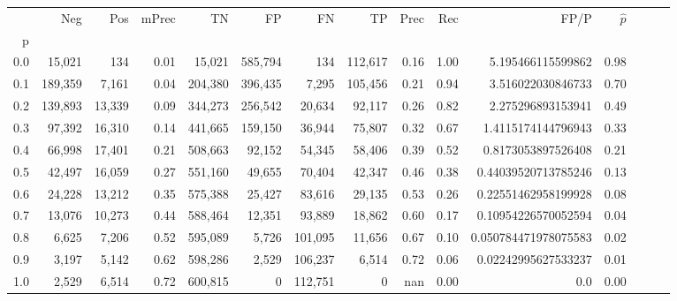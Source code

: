 \begin{tabular}{rrrrrrrrrrrrrrr}
\toprule
{} &      Neg &     Pos & mPrec &       TN &       FP &       FN &       TP &  Prec &   Rec &                  FP/P & $\hat{p}$ \\
p   &          &         &       &          &          &          &          &       &       &                       &           \\
\midrule
0.0 &   15,021 &     134 &  0.01 &   15,021 &  585,794 &      134 &  112,617 &  0.16 &  1.00 &     5.195466115599862 &      0.98 \\
0.1 &  189,359 &   7,161 &  0.04 &  204,380 &  396,435 &    7,295 &  105,456 &  0.21 &  0.94 &     3.516022030846733 &      0.70 \\
0.2 &  139,893 &  13,339 &  0.09 &  344,273 &  256,542 &   20,634 &   92,117 &  0.26 &  0.82 &     2.275296893153941 &      0.49 \\
0.3 &   97,392 &  16,310 &  0.14 &  441,665 &  159,150 &   36,944 &   75,807 &  0.32 &  0.67 &    1.4115174144796943 &      0.33 \\
0.4 &   66,998 &  17,401 &  0.21 &  508,663 &   92,152 &   54,345 &   58,406 &  0.39 &  0.52 &    0.8173053897526408 &      0.21 \\
0.5 &   42,497 &  16,059 &  0.27 &  551,160 &   49,655 &   70,404 &   42,347 &  0.46 &  0.38 &   0.44039520713785246 &      0.13 \\
0.6 &   24,228 &  13,212 &  0.35 &  575,388 &   25,427 &   83,616 &   29,135 &  0.53 &  0.26 &   0.22551462958199928 &      0.08 \\
0.7 &   13,076 &  10,273 &  0.44 &  588,464 &   12,351 &   93,889 &   18,862 &  0.60 &  0.17 &   0.10954226570052594 &      0.04 \\
0.8 &    6,625 &   7,206 &  0.52 &  595,089 &    5,726 &  101,095 &   11,656 &  0.67 &  0.10 &  0.050784471978075583 &      0.02 \\
0.9 &    3,197 &   5,142 &  0.62 &  598,286 &    2,529 &  106,237 &    6,514 &  0.72 &  0.06 &   0.02242995627533237 &      0.01 \\
1.0 &    2,529 &   6,514 &  0.72 &  600,815 &        0 &  112,751 &        0 &   nan &  0.00 &                   0.0 &      0.00 \\
\bottomrule
\end{tabular}
